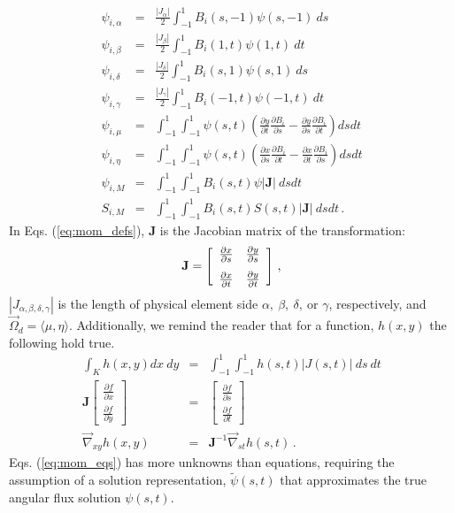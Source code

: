 \documentclass{mc2015}
\newcommand{\benum}{\begin{equation}} 			%
\newcommand{\eenum}{\end{equation}}
\newcommand{\beanum}{\begin{eqnarray}}  %
\newcommand{\eeanum}{\end{eqnarray}}
\newcommand{\eqts}[1]{Eqs. (\ref{#1})}  %
\newcommand{\B}[1]{\ensuremath{{B_{#1} }}}
\newcommand{\p}{\ensuremath{ \partial}}
\newcommand{\abs}[1]{\ensuremath{\left\lvert #1 \right\rvert}}
\newcommand{\omg}{\ensuremath{\vec{\Omega}}}
\newcommand{\pec}{\, ,}
\newcommand{\pep}{\, .}
\begin{document}
\begin{subequations}
\label{eq:mom_defs}
\beanum
\psi_{i,\alpha} &=& \frac{\abs{J_{\alpha}}}{2}\int_{-1}^{1}{\B{i}(s,-1)\psi(s,-1)~ds}\\
\psi_{i,\beta} &=& \frac{\abs{J_{\beta}}}{2}\int_{-1}^{1}{\B{i}(1,t)\psi(1,t)~dt}  \\
\psi_{i,\delta} &=& \frac{\abs{J_{\delta}}}{2}\int_{-1}^{1}{\B{i}(s,1)\psi(s,1)~ds} \\
\psi_{i,\gamma} &=& \frac{\abs{J_{\gamma}}}{2}\int_{-1}^{1}{\B{i}(-1,t)\psi(-1,t)~dt} \\
\psi_{i,\mu} &=& \int_{-1}^1{\int_{-1}^1{\psi(s,t)\left(\frac{\p y}{\p t}\frac{\p \B{i}}{\p s} - \frac{\p y}{\p s}\frac{\p \B{i}}{\p t}  \right) dsdt}} \\
\psi_{i,\eta} &=& \int_{-1}^1{\int_{-1}^1{ \psi(s,t) \left( \frac{\p x}{\p s}\frac{\p \B{i}}{\p t} - \frac{\p x}{\p t}\frac{\p \B{i}}{\p s} \right)dsdt}} \\
\psi_{i,M} &=& \int_{-1}^1{\int_{-1}^1{ \B{i}(s,t) \psi \abs{\mathbf J}~dsdt}} \\
S_{i,M} &=&  \int_{-1}^1{\int_{-1}^1{ \B{i}(s,t) S(s,t) \abs{\mathbf J}~dsdt}} \pep
\eeanum
\end{subequations}
In \eqts{eq:mom_defs}, $\mathbf{J}$ is the Jacobian matrix of the transformation:
\benum
\mathbf{J} = \left[ \begin{array}{cc} 
\frac{\p x}{\p s} & \frac{\p y}{\p s} \vspace{0.1in}\\
\frac{\p x}{\p t} & \frac{\p y}{\p t}
\end{array}\right] \pec
\eenum
$\abs{J_{\alpha,\beta,\delta,\gamma}}$ is the length of physical element side $\alpha,~\beta,~\delta,~\text{or }\gamma$, respectively, and $\omg_d = \langle \mu , \eta \rangle$.
Additionally, we remind the reader that for a function, $h(x,y)$ the following hold true\cite{dfem_book}.
\beanum
\int_K{h(x,y) dx~dy} &=& \int_{-1}^1{\int_{-1}^1{ h(s,t) \abs{J(s,t) } ~ds~dt}} \\
\mathbf{J} \left[ \begin{array}{c} \frac{\p f}{\p x} \\ \frac{\p f}{\p y} \end{array} \right] &=& \left[ \begin{array}{c} \frac{\p f}{\p s} \\ \frac{\p f}{\p t} \end{array} \right] \\
\vec{\nabla}_{xy} h(x,y) &=& \mathbf{J}^{-1} \vec{\nabla}_{st} h(s,t) \pep
\eeanum
\eqts{eq:mom_eqs} has more unknowns than equations, requiring the assumption of a solution representation, $\widetilde{\psi}(s,t)$ that approximates the true angular flux solution $\psi(s,t)$.
\end{document}
